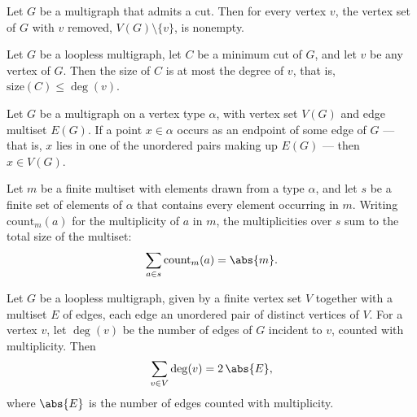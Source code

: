 \begin{lemma}
\label{erase_nonempty_of_cut}
\leanok
{}
Let $G$ be a multigraph that admits a cut. Then for every vertex $v$, the vertex set of
$G$ with $v$ removed, $V(G) \setminus \{v\}$, is nonempty.
\end{lemma}

\begin{lemma}
\label{mincut_le_degree}
\leanok
{}
Let $G$ be a loopless multigraph, let $C$ be a minimum cut of $G$, and let $v$ be any
vertex of $G$. Then the size of $C$ is at most the degree of $v$, that is,
$\mathrm{size}(C) \le \deg(v)$.
\end{lemma}

\begin{lemma}
\label{endpoints_mem_vertices}
\leanok
{}
Let $G$ be a multigraph on a vertex type $\alpha$, with vertex set $V(G)$ and edge
multiset $E(G)$. If a point $x \in \alpha$ occurs as an endpoint of some edge of $G$ —
that is, $x$ lies in one of the unordered pairs making up $E(G)$ — then $x \in V(G)$.
\end{lemma}

\begin{lemma}
\label{sum_counts_eq_card_of_subset}
\leanok
{}
Let $m$ be a finite multiset with elements drawn from a type $\alpha$, and let $s$ be a
finite set of elements of $\alpha$ that contains every element occurring in $m$. Writing
$\mathrm{count}_m(a)$ for the multiplicity of $a$ in $m$, the multiplicities over $s$
sum to the total size of the multiset:
\[
  \sum_{a \in s} \mathrm{count}_m(a) = \abs{m}.
\]
\end{lemma}

\begin{lemma}
\label{sum_degrees_eq_twice_edgeCount}
\leanok
{}
Let $G$ be a loopless multigraph, given by a finite vertex set $V$ together with a
multiset $E$ of edges, each edge an unordered pair of distinct vertices of $V$. For a
vertex $v$, let $\deg(v)$ be the number of edges of $G$ incident to $v$, counted with
multiplicity. Then
\[
  \sum_{v \in V} \deg(v) = 2\,\abs{E},
\]
where $\abs{E}$ is the number of edges counted with multiplicity.
\end{lemma}

